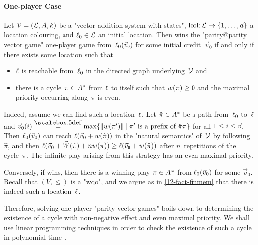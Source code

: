 \paragraph{One-player Case}
Let $\mathcal V=(\mathcal L,A,k)$ be a "vector addition system with states",
$\mathrm{lcol}{:}\,\mathcal L\to\{1,\dots,d\}$ a location colouring, and
$\ell_0\in\mathcal L$ an initial location.  Then \Eve wins the
"parity@parity vector game" one-player game from~$\ell_0(\vec v_0)$
for some initial credit~$\vec v_0$ if and only if there exists some
location such that
\begin{itemize}
\item $\ell$ is reachable from~$\ell_0$ in the directed graph
  underlying~$\mathcal V$ and
\item there is a cycle~$\pi\in A^\ast$ from $\ell$ to itself such
  that $w(\pi)\geq 0$ and the maximal priority occurring
  along~$\pi$ is even.
\end{itemize}
Indeed, assume we can find such a location~$\ell$.  Let
$\hat\pi\in A^\ast$ be a path from~$\ell_0$ to~$\ell$ and $\vec
v_0(i)\eqdef\max\{\|\weight(\pi')\|\mid\pi'\text{ is a prefix of
}\hat\pi\pi\}$ for all $1\leq i\leq\dd$.  Then $\ell_0(\vec v_0)$ can
reach $\ell(\vec v_0+w(\hat\pi))$ in the "natural semantics"
of~$\mathcal V$ by following~$\hat\pi$, and then $\ell(\vec v_0+\vec
W(\hat\pi)+nw(\pi))\geq \ell(\vec v_0+w(\hat\pi))$ after
$n$~repetitions of the cycle~$\pi$.  The infinite play arising from
this strategy has an even maximal priority.

Conversely, if \Eve wins, then there is a winning play
$\pi\in A^\omega$ from $\ell_0(\vec v_0)$ for some $\vec v_0$.
Recall that $(V,{\leq})$ is a "wqo", and we argue as in
\cref{12-fact-finmem} that there is indeed such a location~$\ell$.

\medskip
Therefore, solving one-player "parity vector games" boils down to
determining the existence of a cycle with non-negative effect and even
maximal priority.  We shall use linear programming techniques in order
to check the existence of such a cycle in polynomial
time~\cite{Kosaraju&Sullivan:1988}.

